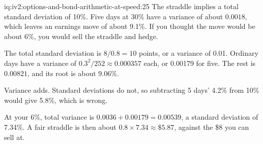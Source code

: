 \begin{solution}{iq:iv2:options-and-bond-arithmetic-at-speed:25}
The straddle implies a total standard deviation of 10\%. Five days at 30\% have a variance of about $0.0018$, which leaves an earnings move of about 9.1\%. If you thought the move would be about 6\%, you would sell the straddle and hedge.

The total standard deviation is $8/0.8 = 10$ points, or a variance of 0.01. Ordinary days have a variance of $0.3^2/252 \approx 0.000357$ each, or 0.00179 for five. The rest is $0.00821$, and its root is about 9.06\%.

Variance adds. Standard deviations do not, so subtracting 5 days' 4.2\% from 10\% would give 5.8\%, which is wrong.

At your 6\%, total variance is $0.0036 + 0.00179 = 0.00539$, a standard deviation of 7.34\%. A fair straddle is then about $0.8 \times 7.34 \approx \$5.87$, against the \$8 you can sell at.

\end{solution}

